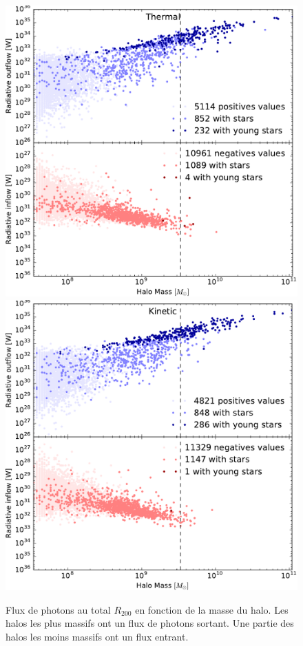 \begin{figure}
	\includegraphics[height=.30\textheight]{img/03/flux_rad_therm.pdf} 
	\includegraphics[height=.30\textheight]{img/03/flux_rad_kinetic.pdf} 
    \caption[Flux de photons au $R_{200}$]{Flux de photons au total $R_{200}$ en fonction de la masse du halo. 
    Les halos les plus massifs ont un flux de photons sortant. 
    Une partie des halos les moins massifs ont un flux entrant.}
 	\label{fig:R200rad}
\end{figure}



